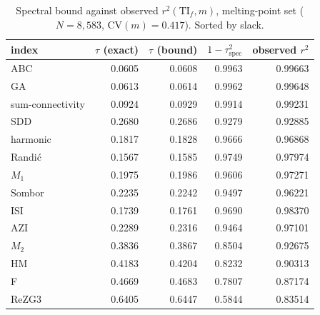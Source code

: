 \documentclass[11pt,a4paper]{article}
\theoremstyle{plain}
\newcommand{\TI}{\mathrm{TI}}
\newcommand{\CV}{\mathrm{CV}}
\begin{document}
\begin{table}[h]\centering\small
\caption{Spectral bound against observed $r^2(\TI_f,m)$, melting-point set
($N=8{,}583$, $\CV(m)=0.417$). Sorted by slack.}
\begin{tabular}{lrrrr}
\toprule
index & $\tau$ (exact) & $\tau$ (bound) & $1-\tau^2_{\text{spec}}$ & observed $r^2$\\
\midrule
ABC & 0.0605 & 0.0608 & 0.9963 & 0.99663\\
GA & 0.0613 & 0.0614 & 0.9962 & 0.99648\\
sum-connectivity & 0.0924 & 0.0929 & 0.9914 & 0.99231\\
SDD & 0.2680 & 0.2686 & 0.9279 & 0.92885\\
harmonic & 0.1817 & 0.1828 & 0.9666 & 0.96868\\
Randi\'c & 0.1567 & 0.1585 & 0.9749 & 0.97974\\
$M_1$ & 0.1975 & 0.1986 & 0.9606 & 0.97271\\
Sombor & 0.2235 & 0.2242 & 0.9497 & 0.96221\\
ISI & 0.1739 & 0.1761 & 0.9690 & 0.98370\\
AZI & 0.2289 & 0.2316 & 0.9464 & 0.97101\\
$M_2$ & 0.3836 & 0.3867 & 0.8504 & 0.92675\\
HM & 0.4183 & 0.4204 & 0.8232 & 0.90313\\
F & 0.4669 & 0.4683 & 0.7807 & 0.87174\\
ReZG3 & 0.6405 & 0.6447 & 0.5844 & 0.83514\\
\bottomrule
\end{tabular}
\end{table}
\end{document}
